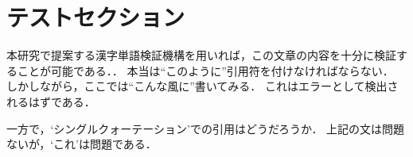 \section{テストセクション}

本研究で提案する漢字単語検証機構を用いれば，この文章の内容を十分に検証することが可能である．．
本当は``このように''引用符を付けなければならない．
しかしながら，ここでは“こんな風に”書いてみる．
これはエラーとして検出されるはずである．

一方で，`シングルクォーテーション'での引用はどうだろうか．
上記の文は問題ないが，‘これ’は問題である．

